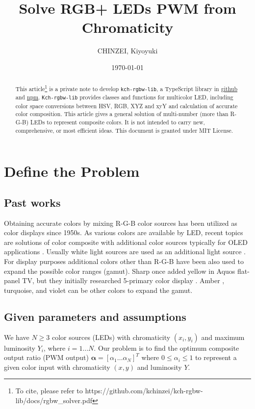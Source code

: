 \documentclass[dvipdfmx,uplatex,a4paper]{article}
\title{Solve RGB+ LEDs PWM from Chromaticity}
\author{CHINZEI, Kiyoyuki}
\date{\today}
\begin{document}
\maketitle

\begin{abstract}
This article\footnote{To cite, please refer to https://github.com/kchinzei/kch-rgbw-lib/docs/rgbw\_solver.pdf} is a private note to develop \texttt{kch-rgbw-lib}, a TypeScript library in \href{https://github.com/kchinzei/kch-rgbw-lib}{github} and \href{https://www.npmjs.com/package/kch-rgbw-lib}{npm}. \texttt{Kch-rgbw-lib} provides classes and functions for multicolor LED, including color space conversions between HSV, RGB, XYZ and xyY and calculation of accurate color composition. This article gives a general solution of multi-number (more than R-G-B) LEDs to represent composite colors. It is not intended to carry new, comprehensive, or most efficient ideas. This document is granted under MIT License.
\end{abstract}

\section{Define the Problem}
\subsection{Past works}\label{s_intro}
Obtaining accurate colors by mixing R-G-B color sources has been utilized as color displays since 1950s. As various colors are available by LED, recent topics are solutions of color composite with additional color sources typically for OLED applications \cite{Chi2011, Lee2014}. Usually white light sources are used as an additional light source \cite{AN1562, Chi2011, Lee2014}. For display purposes additional colors other than R-G-B have been also used to expand the possible color ranges (gamut)\cite{Wikipedia_multicolor}. Sharp once added yellow in Aquos flat-panel TV, but they initially researched 5-primary color display \cite{Sharp2011}. Amber \cite{AN2026}, turquoise, and violet can be other colors to expand the gamut.

\subsection{Given parameters and assumptions}\label{s_assumptions}
We have $N \geq 3$ color sources (LEDs) with chromaticity $(x_i, y_i)$ and maximum luminosity $Y_i$, where $i=1 \ldots N$. Our problem is to find the optimum composite output ratio (PWM output) $\boldsymbol{\alpha} = [\alpha_1 \ldots \alpha_N]^T$ where $0 \leq \alpha_i \leq 1$ to represent a given color input with chromaticity $(x, y)$ and luminosity $Y$.
\end{document}
